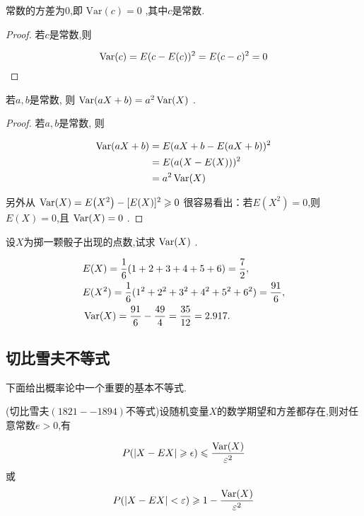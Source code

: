 \begin{property}
	常数的方差为0,即 $\mathrm{Var}(c)=0$ ,其中$ c $是常数.
\end{property}

\begin{proof}
	若$ c $是常数,则
	
	\[
	\operatorname{Var} (c)=E(c-E(c))^{2}=E(c-c)^{2}=0
	\]
	
\end{proof}	


\begin{property}
	若$a,b$是常数, 则 $\operatorname{Var} (a X+b)=a^{2} \operatorname{Var} (X)$ .
\end{property}

\begin{proof}
	若$ a,b $是常数, 则
	
	\[
	\begin{aligned} \operatorname{Var} (a X+b) &=E(a X+b-E(a X+b))^{2} \\ &=E(a(X-E(X)))^{2} \\ &=a^{2} \operatorname{Var} (X) \end{aligned}
	\]
	
	另外从 $\Var (X)=E\left(X^{2}\right)-[E(X)]^{2} \geqslant 0$ 很容易看出：若$ E(X^2)=0 $,则$ E(X)=0 $,且 $\operatorname{Var} (X)=0$ .
	
\end{proof}

\begin{example}
	设$ X $为掷一颗骰子出现的点数,试求 $\operatorname{Var}(X)$ .
\end{example}

\begin{solution}
	\begin{align*}
      & E(X) = \frac{1}{6}(1+2+3+4+5+6) = \frac{7}{2}, \\
      & E(X^{2}) = \frac{1}{6}(1^{2}+2^{2}+3^{2}+4^{2}+5^{2}+6^{2}) = \frac{91}{6}, \\
      & \operatorname{Var}(X) = \frac{91}{6}-\frac{49}{4} = \frac{35}{12} = 2.917.
	\end{align*}
\end{solution}

\subsection{切比雪夫不等式}

下面给出概率论中一个重要的基本不等式.

\begin{theorem}{}{}
	(切比雪夫$ (1821--1894) $不等式)设随机变量$ X $的数学期望和方差都存在,则对任意常数$ e>0 $,有
	
	\begin{equation}
	P(|X-E X| \geqslant \epsilon) \leqslant \frac{\operatorname{Var} (X)}{\varepsilon^{2}} \label{eq:2.3.2}
	\end{equation}
	或
	\begin{equation}
	P(|X-E X|<\varepsilon) \geqslant 1-\frac{\operatorname{Var} (X)}{\varepsilon^{2}} \label{eq:2.3.3}
	\end{equation}
\end{theorem}


